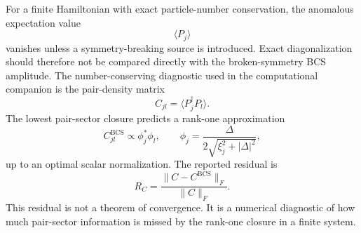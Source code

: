 \documentclass[aps,prb,reprint,superscriptaddress,nofootinbib]{revtex4-2}
\begin{document}
For a finite Hamiltonian with exact particle-number conservation, the anomalous expectation value
\begin{equation}
\langle P_j\rangle
\end{equation}
vanishes unless a symmetry-breaking source is introduced. Exact diagonalization should therefore not be compared directly with the broken-symmetry BCS amplitude. The number-conserving diagnostic used in the computational companion is the pair-density matrix
\begin{equation}
C_{jl}=\langle P_j^\dagger P_l\rangle .
\end{equation}
The lowest pair-sector closure predicts a rank-one approximation
\begin{equation}
C_{jl}^{\mathrm{BCS}}\propto \phi_j^\ast\phi_l,\qquad
\phi_j=\frac{\Delta}{2\sqrt{\xi_j^2+|\Delta|^2}},
\end{equation}
up to an optimal scalar normalization. The reported residual is
\begin{equation}
R_C=
\frac{\|C-C^{\mathrm{BCS}}\|_F}{\|C\|_F}.
\end{equation}
This residual is not a theorem of convergence. It is a numerical diagnostic of how much pair-sector information is missed by the rank-one closure in a finite system.



\end{document}
